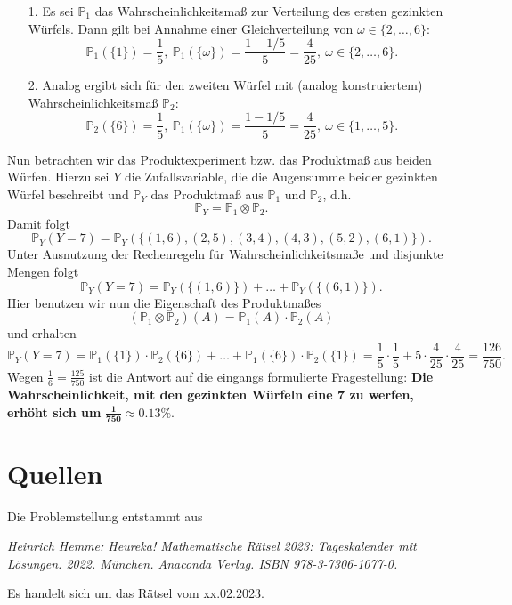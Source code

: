 \documentclass[]{scrartcl}
\begin{document}
\begin{itemize}
	\item[1.]
	{
	Es sei $\mathbb{P}_1$ das Wahrscheinlichkeitsmaß zur Verteilung des ersten gezinkten Würfels.
	Dann gilt bei Annahme einer Gleichverteilung von $\omega \in \{2,\ldots,6\}$:
	$$
	\mathbb{P}_1(\{1\}) = \frac{1}{5}, ~ \mathbb{P}_1(\{\omega\}) = \frac{1-1/5}{5} = \frac{4}{25},
	~ \omega \in \{2,\ldots,6\}.
	$$
	}
	\item[2.]
	{
	Analog ergibt sich für den zweiten Würfel mit (analog konstruiertem) Wahrscheinlichkeitsmaß
	$\mathbb{P}_2$:
	$$
	\mathbb{P}_2(\{6\}) = \frac{1}{5}, ~ \mathbb{P}_1(\{\omega\}) = \frac{1-1/5}{5} = \frac{4}{25},
	~ \omega \in \{1,\ldots,5\}.
	$$
	}
\end{itemize}
Nun betrachten wir das Produktexperiment bzw. das Produktmaß aus beiden Würfen. Hierzu sei $Y$ 
die Zufallsvariable, die die Augensumme beider gezinkten Würfel beschreibt und $\mathbb{P}_Y$ das
Produktmaß aus $\mathbb{P}_1$ und $\mathbb{P}_2$, d.h.
$$
\mathbb{P}_Y = \mathbb{P}_1 \otimes \mathbb{P}_2.
$$
Damit folgt
$$
\mathbb{P}_Y(Y=7) =
\mathbb{P}_Y(\{(1,6),(2,5),(3,4),(4,3),(5,2),(6,1)\}).
$$
Unter Ausnutzung der Rechenregeln für Wahrscheinlichkeitsmaße und disjunkte Mengen folgt
$$
\mathbb{P}_Y(Y=7) =
\mathbb{P}_Y(\{(1,6)\}) + \ldots + \mathbb{P}_Y(\{(6,1)\}).
$$
Hier benutzen wir nun die Eigenschaft des Produktmaßes 
$$
(\mathbb{P}_1 \otimes \mathbb{P}_2)(A) = \mathbb{P}_1(A) \cdot \mathbb{P}_2(A)
$$
und erhalten
$$
\mathbb{P}_Y(Y=7) =
\mathbb{P}_1(\{1\}) \cdot \mathbb{P}_2(\{6\}) + \ldots + \mathbb{P}_1(\{6\}) \cdot
\mathbb{P}_2(\{1\}) = \frac{1}{5} \cdot \frac{1}{5} + 5 \cdot \frac{4}{25} \cdot \frac{4}{25}
= \frac{126}{750}.
$$
Wegen $\frac{1}{6} = \frac{125}{750}$ ist die Antwort auf die eingangs formulierte Fragestellung:
\newline 
\textbf{Die Wahrscheinlichkeit, mit den gezinkten Würfeln eine 7 zu werfen, erhöht sich um} 
$\pmb{\frac{1}{750} \approx 0.13\%}$.

\section*{Quellen}
Die Problemstellung entstammt aus

\centering
	\textit{Heinrich Hemme: Heureka! Mathematische Rätsel 2023: Tageskalender mit Lösungen.
	2022. München. Anaconda Verlag. ISBN 978-3-7306-1077-0.}

\raggedright
Es handelt sich um das Rätsel vom xx.02.2023.
\end{document}
